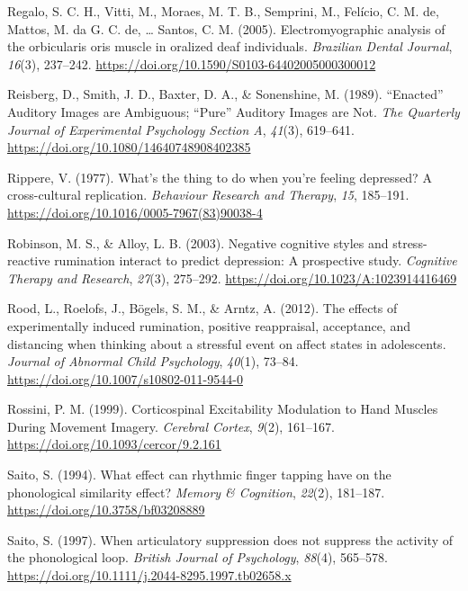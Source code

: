 \documentclass[a4paper,12pt,twoside,openright,oldfontcommands]{memoir}
\begin{document}
\leavevmode\hypertarget{ref-regalo_electromyographic_2005}{}%
Regalo, S. C. H., Vitti, M., Moraes, M. T. B., Semprini, M., Felício, C. M. de, Mattos, M. da G. C. de, \ldots{} Santos, C. M. (2005). Electromyographic analysis of the orbicularis oris muscle in oralized deaf individuals. \emph{Brazilian Dental Journal}, \emph{16}(3), 237--242. \url{https://doi.org/10.1590/S0103-64402005000300012}

\leavevmode\hypertarget{ref-reisberg_enacted_1989}{}%
Reisberg, D., Smith, J. D., Baxter, D. A., \& Sonenshine, M. (1989). ``Enacted'' Auditory Images are Ambiguous; ``Pure'' Auditory Images are Not. \emph{The Quarterly Journal of Experimental Psychology Section A}, \emph{41}(3), 619--641. \url{https://doi.org/10.1080/14640748908402385}

\leavevmode\hypertarget{ref-Rippere1977}{}%
Rippere, V. (1977). What's the thing to do when you're feeling depressed? A cross-cultural replication. \emph{Behaviour Research and Therapy}, \emph{15}, 185--191. \url{https://doi.org/10.1016/0005-7967(83)90038-4}

\leavevmode\hypertarget{ref-Robinson2003}{}%
Robinson, M. S., \& Alloy, L. B. (2003). Negative cognitive styles and stress-reactive rumination interact to predict depression: A prospective study. \emph{Cognitive Therapy and Research}, \emph{27}(3), 275--292. \url{https://doi.org/10.1023/A:1023914416469}

\leavevmode\hypertarget{ref-Rood2012}{}%
Rood, L., Roelofs, J., Bögels, S. M., \& Arntz, A. (2012). The effects of experimentally induced rumination, positive reappraisal, acceptance, and distancing when thinking about a stressful event on affect states in adolescents. \emph{Journal of Abnormal Child Psychology}, \emph{40}(1), 73--84. \url{https://doi.org/10.1007/s10802-011-9544-0}

\leavevmode\hypertarget{ref-rossini_corticospinal_1999}{}%
Rossini, P. M. (1999). Corticospinal Excitability Modulation to Hand Muscles During Movement Imagery. \emph{Cerebral Cortex}, \emph{9}(2), 161--167. \url{https://doi.org/10.1093/cercor/9.2.161}

\leavevmode\hypertarget{ref-saito_what_1994}{}%
Saito, S. (1994). What effect can rhythmic finger tapping have on the phonological similarity effect? \emph{Memory \& Cognition}, \emph{22}(2), 181--187. \url{https://doi.org/10.3758/bf03208889}

\leavevmode\hypertarget{ref-saito_when_1997}{}%
Saito, S. (1997). When articulatory suppression does not suppress the activity of the phonological loop. \emph{British Journal of Psychology}, \emph{88}(4), 565--578. \url{https://doi.org/10.1111/j.2044-8295.1997.tb02658.x}
\end{document}

